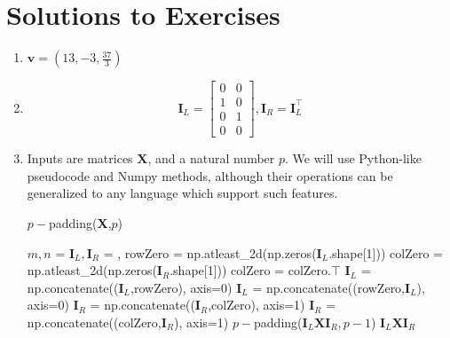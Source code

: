 \section{Solutions to Exercises}
\begin{enumerate}
    \item $\textbf{v} = (13,-3,\frac{37}{3})$
            
    \item $$\textbf{I}_L = \begin{bmatrix}
        0 & 0 \\ 1 & 0 \\ 0 & 1 \\ 0 & 0
    \end{bmatrix}, \textbf{I}_R = \textbf{I}_L^{\intercal}$$
    
    \item Inputs are matrices $\textbf{X}$, and a natural number $p$. We will use Python-like pseudocode and Numpy methods, although their operations can be generalized to any language which support such features.
    \begin{algorithm}
    \caption{$p-$padding(\textbf{X},$p$)}
    \begin{algorithmic}[1]
        \State $m,n$ = 
        \State $\textbf{I}_L, \textbf{I}_R$ = ,\;
        \State rowZero = np.atleast\_2d(np.zeros($\textbf{I}_L$.shape[1]))
        \State colZero = np.atleast\_2d(np.zeros($\textbf{I}_R$.shape[1]))
        \State colZero = colZero.$\intercal$
        \State $\textbf{I}_L$ = np.concatenate(($\textbf{I}_L$,rowZero), axis=0)
        \State $\textbf{I}_L$ = np.concatenate((rowZero,$\textbf{I}_L$), axis=0)
        \State $\textbf{I}_R$ = np.concatenate(($\textbf{I}_R$,colZero), axis=1)
        \State $\textbf{I}_R$ = np.concatenate((colZero,$\textbf{I}_R$), axis=1)
		\State \Return $p-$padding($\textbf{I}_L\textbf{X}\textbf{I}_R, p-1$)
		\EndIf
        \State \Return $\textbf{I}_L\textbf{X}\textbf{I}_R$
	\end{algorithmic} 
\end{algorithm}
\end{enumerate}